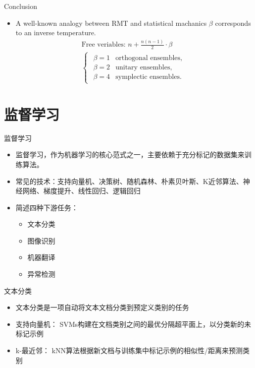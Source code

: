 \documentclass[UTF8,AutoFakeBold,AutoFakeSlant]{beamer}
\begin{document}
\begin{frame}{Conclusion}
    \begin{itemize}
        \scriptsize
        \item A well-known analogy between RMT and statistical machanics $\beta$ corresponds to an inverse temperature.
              \begin{align*}
                  \text{Free veriables: }n+\frac{n(n-1)}{2}\cdot \beta \\
                  \left\{\begin{matrix}\begin{aligned}
                          \beta=1 & \text{orthogonal ensembles,} \\
                          \beta=2 & \text{unitary ensembles,}    \\
                          \beta=4 & \text{symplectic ensembles.}
                      \end{aligned}
                         \end{matrix}\right.
              \end{align*}
    \end{itemize}
\end{frame}

\section{监督学习}
\begin{frame}{监督学习}
    \begin{itemize}
        \item 监督学习，作为机器学习的核心范式之一，主要依赖于充分标记的数据集来训练算法。
        \item 常见的技术：支持向量机、决策树、随机森林、朴素贝叶斯、K近邻算法、神经网络、梯度提升、线性回归、逻辑回归
        \item 简述四种下游任务：
              \begin{itemize}
                  \item 文本分类
                  \item 图像识别
                  \item 机器翻译
                  \item 异常检测
              \end{itemize}
    \end{itemize}
\end{frame}

\begin{frame}{文本分类}
    \small
    \begin{itemize}
        \item 文本分类是一项自动将文本文档分类到预定义类别的任务
        \item 支持向量机： SVMs构建在文档类别之间的最优分隔超平面上，以分类新的未标记示例
        \item k-最近邻： kNN算法根据新文档与训练集中标记示例的相似性/距离来预测类别
    \end{itemize}
\end{frame}
\end{document}
